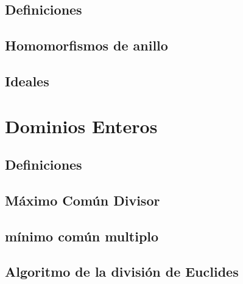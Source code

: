     \subsection{Definiciones}



    \subsection{Homomorfismos de anillo}



    \subsection{Ideales}



\newpage
\section{Dominios Enteros}


    \subsection{Definiciones}



    \subsection{Máximo Común Divisor}



    \subsection{mínimo común multiplo}



    \subsection{Algoritmo de la división de Euclides}

